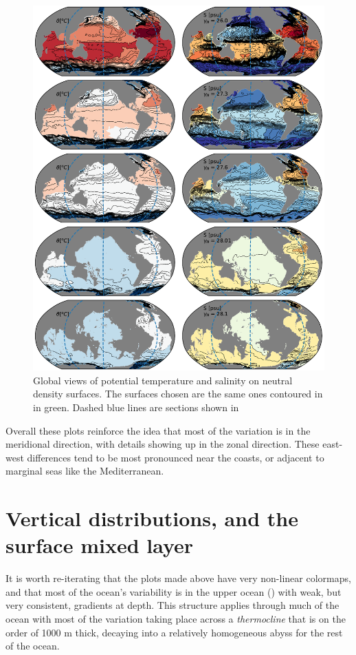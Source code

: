 \begin{figure}
  \centering
  \includegraphics[width=7in]{figs/WaterMasses/TSGammaSurf.pdf}
    \caption{Global views of potential temperature and salinity on neutral density surfaces.  The surfaces chosen are the same ones contoured in  in green.   Dashed blue lines are sections shown in }
    \label{fig:TSGammaSurf}  
\end{figure}

Overall these plots reinforce the idea that most of the variation is in the meridional direction, with details showing up in the zonal direction.  These east-west differences tend to be most pronounced near the coasts, or adjacent to marginal seas like the Mediterranean.  

\section{Vertical distributions, and the surface mixed layer}

It is worth re-iterating that the plots made above have very non-linear colormaps, and that most of the ocean's variability is in the upper ocean () with weak, but very consistent, gradients at depth.  This structure applies through much of the ocean with most of the variation taking place across a \emph{thermocline} that is on the order of 1000 m thick, decaying into a relatively homogeneous abyss for the rest of the ocean.  

